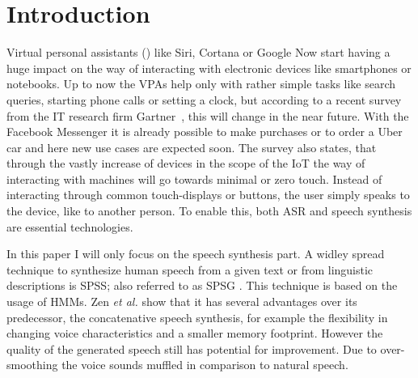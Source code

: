 

\section{Introduction}
\label{sec:introduction}

Virtual personal assistants () like Siri, Cortana or Google Now start having a huge impact on the way of interacting with electronic devices like smartphones or notebooks. Up to now the \acp{VPA} help only with rather simple tasks like search queries, starting phone calls or setting a clock, but according to a recent survey from the IT research firm Gartner~\cite{gartner:assistants}, this will change in the near future. With the Facebook Messenger it is already possible to make purchases or to order a Uber car and here new use cases are expected soon. The survey also states, that through the vastly increase of devices in the scope of the \ac{IoT} the way of interacting with machines will go towards minimal or zero touch. Instead of interacting through common touch-displays or buttons, the user simply speaks to the device, like to another person. To enable this, both \ac{ASR} and speech synthesis are essential technologies.

In this paper I will only focus on the speech synthesis part. A widley spread technique to synthesize human speech from a given text or from linguistic descriptions is \ac{SPSS}; also referred to as \ac{SPSG} \cite{ling:deep}. This technique is based on the usage of \acp{HMM}. Zen \textsl{et al.} \cite{zen:statistical} show that it has several advantages over its predecessor, the concatenative speech synthesis, for example the flexibility in changing voice characteristics and a smaller memory footprint. However the quality of the generated speech still has potential for improvement. Due to over-smoothing the voice sounds muffled in comparison to natural speech.

